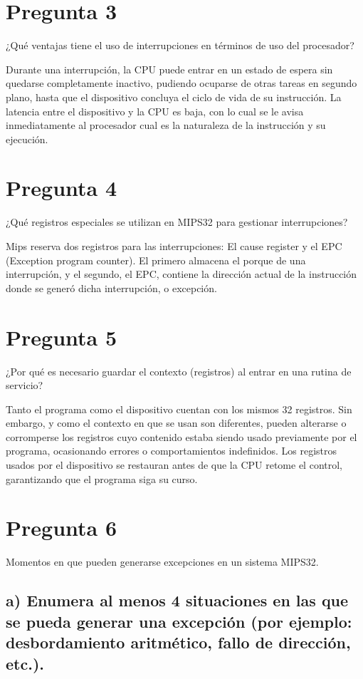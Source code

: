 \documentclass[12pt]{article}
\begin{document}
\section*{Pregunta 3}
¿Qué ventajas tiene el uso de interrupciones en términos de uso del procesador?

Durante una interrupción, la CPU puede entrar en un estado de espera sin quedarse completamente inactivo, pudiendo ocuparse de otras tareas en segundo plano, hasta que el dispositivo concluya el ciclo de vida de su instrucción. La latencia entre el dispositivo y la CPU es baja, con lo cual se le avisa inmediatamente al procesador cual es la naturaleza de la instrucción y su ejecución.

\section*{Pregunta 4}
¿Qué registros especiales se utilizan en MIPS32 para gestionar interrupciones?

Mips reserva dos registros para las interrupciones: El cause register y el EPC (Exception program counter). El primero almacena el porque de una interrupción, y el segundo, el EPC, contiene la dirección actual de la instrucción donde se generó dicha interrupción, o excepción.

\section*{Pregunta 5}
¿Por qué es necesario guardar el contexto (registros) al entrar en una rutina de servicio?

Tanto el programa como el dispositivo cuentan con los mismos 32 registros. Sin embargo, y como el contexto en que se usan son diferentes, pueden alterarse o corromperse los registros cuyo contenido estaba siendo usado previamente por el programa, ocasionando errores o comportamientos indefinidos. Los registros usados por el dispositivo se restauran antes de que la CPU retome el control, garantizando que el programa siga su curso.

\section*{Pregunta 6}
Momentos en que pueden generarse excepciones en un sistema MIPS32.

\subsection*{a) Enumera al menos 4 situaciones en las que se pueda generar una excepción (por ejemplo: desbordamiento aritmético, fallo de dirección, etc.).}
\end{document}
